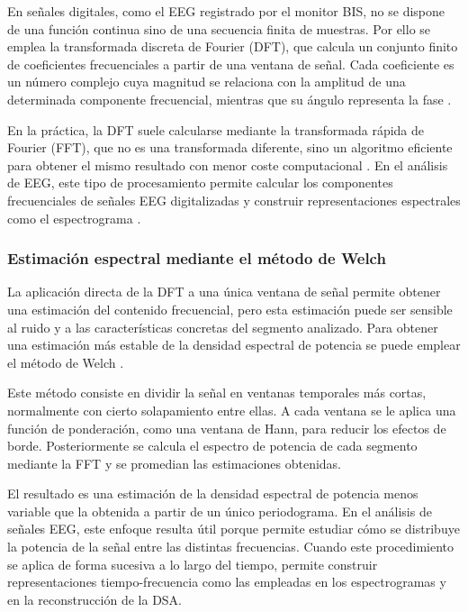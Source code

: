 \documentclass[
  spanish,
  a4paper,
  12pt,
  twoside]{memoir}
\begin{document}
En señales digitales, como el EEG registrado por el monitor BIS, no se
dispone de una función continua sino de una secuencia finita de
muestras. Por ello se emplea la transformada discreta de Fourier (DFT),
que calcula un conjunto finito de coeficientes frecuenciales a partir de
una ventana de señal. Cada coeficiente es un número complejo cuya
magnitud se relaciona con la amplitud de una determinada componente
frecuencial, mientras que su ángulo representa la fase
\citep{OppenheimSchafer2014}.

En la práctica, la DFT suele calcularse mediante la transformada rápida
de Fourier (FFT), que no es una transformada diferente, sino un
algoritmo eficiente para obtener el mismo resultado con menor coste
computacional \citep{OppenheimSchafer2014}. En el análisis de EEG, este
tipo de procesamiento permite calcular los componentes frecuenciales de
señales EEG digitalizadas y construir representaciones espectrales como
el espectrograma \citep{Sawa2022}.

\subsubsection{Estimación espectral mediante el método de
Welch}\label{estimaciuxf3n-espectral-mediante-el-muxe9todo-de-welch}

La aplicación directa de la DFT a una única ventana de señal permite
obtener una estimación del contenido frecuencial, pero esta estimación
puede ser sensible al ruido y a las características concretas del
segmento analizado. Para obtener una estimación más estable de la
densidad espectral de potencia se puede emplear el método de Welch
\citep{Welch1967, OppenheimSchafer2014}.

Este método consiste en dividir la señal en ventanas temporales más
cortas, normalmente con cierto solapamiento entre ellas. A cada ventana
se le aplica una función de ponderación, como una ventana de Hann, para
reducir los efectos de borde. Posteriormente se calcula el espectro de
potencia de cada segmento mediante la FFT y se promedian las
estimaciones obtenidas.

El resultado es una estimación de la densidad espectral de potencia
menos variable que la obtenida a partir de un único periodograma. En el
análisis de señales EEG, este enfoque resulta útil porque permite
estudiar cómo se distribuye la potencia de la señal entre las distintas
frecuencias. Cuando este procedimiento se aplica de forma sucesiva a lo
largo del tiempo, permite construir representaciones tiempo-frecuencia
como las empleadas en los espectrogramas y en la reconstrucción de la
DSA.
\end{document}
